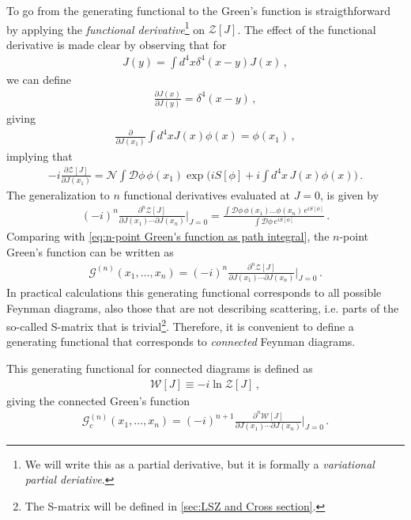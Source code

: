 To go from the generating functional to the Green's function is straigthforward by applying the \emph{functional derivative}\footnote{We will write this as a partial derivative, but it is formally a \emph{variational partial deriative}.} on $\mathcal{Z}[J]$. The effect of the functional derivative is made clear by observing that for
\begin{align}
    J(y)=\int d^{4}x\delta^{4}(x-y)J(x)\,,
\end{align}
we can define
\begin{align}
    \frac{\partial J(x)}{\partial J(y)}=\delta^{4}(x-y)\,,
\end{align}
giving
\begin{align}\label{eq:functional derivative of source and field}
    \frac{\partial}{\partial J(x_1)}\int d^{4}x J(x)\phi(x)=\phi(x_1)\,,
\end{align}
implying that
\begin{align}
    -i\frac{\partial\mathcal{Z}[J]}{\partial J(x_1)}=\mathcal{N}\int\mathcal{D}\phi\,\phi(x_1)\exp\big(iS[\phi]+i\int d^{4}x\,J(x)\phi(x)\big)\,.
\end{align}
The generalization to $n$ functional derivatives evaluated at $J=0$, is given by
\begin{align}\label{eq:GF and GF}
    (-i)^{n}\frac{\partial^{n}\mathcal{Z}[J]}{\partial J(x_1)\cdots\partial J(x_n)}\Big|_{J=0}=\frac{\int\mathcal{D}\phi \,\phi(x_1)\dots\phi(x_n)\,e^{iS[\phi]}}{\int\mathcal{D}\phi \,e^{iS[\phi]}}\,.
\end{align}
Comparing with \cref{eq:n-point Green's function as path integral}, the $n$-point Green's function can be written as
\begin{align}\label{eq:generating functional Z}
    \mathcal{G}^{(n)}(x_1,\dots,x_n)=(-i)^{n}\frac{\partial^{n}\mathcal{Z}[J]}{\partial J(x_1)\cdots\partial J(x_n)}\Big|_{J=0}\,.
\end{align}
In practical calculations this generating functional corresponds to all possible Feynman diagrams, also those that are not describing scattering, i.e. parts of the so-called S-matrix that is trivial\footnote{The S-matrix will be defined in \cref{sec:LSZ and Cross section}.}. Therefore, it is convenient to define a generating functional that corresponds to \emph{connected} Feynman diagrams.

This generating functional for connected diagrams is defined as
\begin{align}
    \mathcal{W}[J]\equiv-i\ln\mathcal{Z}[J]\,,
\end{align}
giving the connected Green's function
\begin{align}\label{eq:generating functional W}
    \mathcal{G}_{c}^{(n)}(x_1,\dots,x_n)=(-i)^{n+1}\frac{\partial^{n}\mathcal{W}[J]}{\partial J(x_1)\cdots\partial J(x_n)}\Big|_{J=0}\,.
\end{align}

